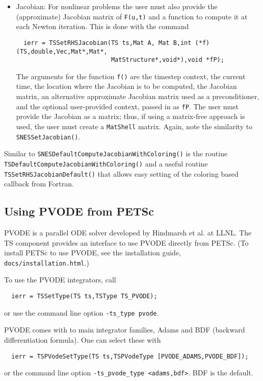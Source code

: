 {\begin{itemize}
\item Jacobian: For nonlinear problems the user must also provide the 
(approximate) Jacobian matrix of {\tt F(u,t)} and a function to
compute it at each Newton iteration. This is done with the command
\begin{verbatim}
  ierr = TSSetRHSJacobian(TS ts,Mat A, Mat B,int (*f)(TS,double,Vec,Mat*,Mat*,
                          MatStructure*,void*),void *fP);
\end{verbatim}
The  arguments for the function {\tt f()} are
the timestep context, the current time, the location where the
Jacobian is to be computed, the Jacobian matrix, an alternative
approximate Jacobian matrix used as a preconditioner, and the optional
user-provided context, passed in as {\tt fP}. The user must provide the 
Jacobian as a matrix; thus, if using a matrix-free approach is used, the
user must create a {\tt MatShell} matrix. Again, note the similarity
to {\tt SNESSetJacobian()}. 
\end{itemize}

Similar to {\tt SNESDefaultComputeJacobianWithColoring()} is the
routine {\tt TSDefaultComputeJacobianWithColoring()} and a useful 
 routine 
{\tt TSSetRHSJacobianDefault()} that 
allows easy setting of the coloring based callback from Fortran.

\subsection{Using PVODE from PETSc}

PVODE is a parallel ODE solver developed by Hindmarsh et al. at LLNL.
The TS component provides an interface to use PVODE directly from PETSc.
(To install PETSc to use PVODE, see the installation guide, {\tt docs/installation.html}.) 

To use the PVODE integrators, call 
\begin{verbatim}
  ierr = TSSetType(TS ts,TSType TS_PVODE);
\end{verbatim}
or use the command line option {\tt -ts\_type pvode}.  
  

PVODE comes with to main integrator families, Adams and BDF (backward 
differentiation formula). One can select these with 
\begin{verbatim}
  ierr = TSPVodeSetType(TS ts,TSPVodeType [PVODE_ADAMS,PVODE_BDF]);
\end{verbatim}
or the command line option {\tt -ts\_pvode\_type <adams,bdf>}. BDF is
the default.  
  

}
